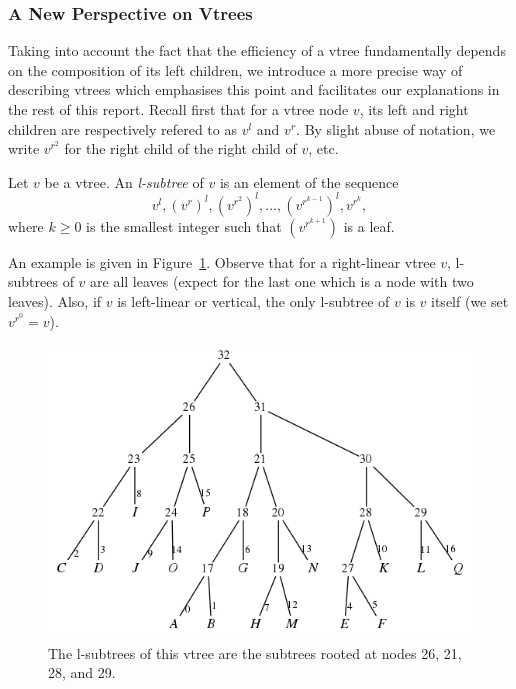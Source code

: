 \documentclass[11pt]{article}
\newenvironment{definition}[1][Definition]{\begin{trivlist}
\item[\hskip \labelsep {\bfseries #1}]}{\end{trivlist}}
\begin{document}
\subsubsection{A New Perspective on Vtrees}

Taking into account the fact that the efficiency of a vtree fundamentally depends on the composition of its left children, we introduce a more precise way of describing vtrees which emphasises this point and facilitates our explanations in the rest of this report. Recall first that for a vtree node $v$, its left and right children are respectively refered to as $v^l$ and $v^r$. By slight abuse of notation, we write $v^{r^2}$ for the right child of the right child of $v$, etc.

\begin{definition} Let $v$ be a vtree. An \textit{l-subtree} of $v$ is an element of the sequence $$v^l, (v^r)^l, (v^{r^2})^l, ..., (v^{r^{k-1}})^l, v^{r^k},$$ where $k \geq 0$ is the smallest integer such that $(v^{r^{k+1}})$ is a leaf.
\end{definition}

An example is given in Figure~\ref{fig:lsubtrees_vtree_example}. Observe that for a right-linear vtree $v$, l-subtrees of $v$ are all leaves (expect for the last one which is a node with two leaves). Also, if $v$ is left-linear or vertical, the only l-subtree of $v$ is $v$ itself (we set $v^{r^0} = v$). 

\begin{figure}
\centering
\includegraphics[scale=0.5]{pseudorightlinearfirstexample.png}
\caption{The l-subtrees of this vtree are the subtrees rooted at nodes 26, 21, 28, and 29.}
\label{fig:lsubtrees_vtree_example}
\end{figure}
\end{document}
